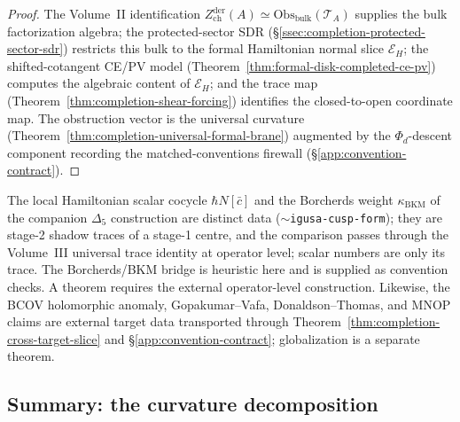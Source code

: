 \begin{proof}
The Volume~II identification
\(Z^{\mathrm{der}}_{\mathrm{ch}}(A)\simeq
\mathrm{Obs}_{\mathrm{bulk}}(\mathcal T_A)\) supplies the bulk
factorization algebra; the protected-sector SDR
(\S\ref{ssec:completion-protected-sector-sdr}) restricts this
bulk to the formal Hamiltonian normal slice \(\mathcal E_H\); the
shifted-cotangent CE/PV model
(Theorem~\ref{thm:formal-disk-completed-ce-pv}) computes the
algebraic content of \(\mathcal E_H\); and the trace map
(Theorem~\ref{thm:completion-shear-forcing}) identifies the
closed-to-open coordinate map.  The obstruction vector is the
universal curvature
(Theorem~\ref{thm:completion-universal-formal-brane}) augmented by
the \(\Phi_d\)-descent component recording the matched-conventions
firewall (\S\ref{app:convention-contract}).
\end{proof}

\begin{rmk}
\label{rmk:completion-modular-bkm}
The local Hamiltonian scalar cocycle \(\hbar N[\bar c]\) and the
Borcherds weight \(\kappa_{\mathrm{BKM}}\) of the companion
\(\Delta_5\) construction are distinct data
(\(\sim\)\texttt{igusa-cusp-form}); they are stage-2 shadow traces
of a stage-1 centre, and the comparison passes through the
Volume~III universal trace identity at operator level; scalar numbers are
only its trace.  The Borcherds/BKM bridge is heuristic here and is
supplied as convention checks.  A theorem requires the external
operator-level construction.  Likewise, the BCOV holomorphic anomaly,
Gopakumar--Vafa, Donaldson--Thomas, and MNOP claims are external
target data transported through
Theorem~\ref{thm:completion-cross-target-slice} and
\S\ref{app:convention-contract}; globalization is a separate theorem.
\end{rmk}

\subsection{Summary: the curvature decomposition}
\label{ssec:completion-summary}

